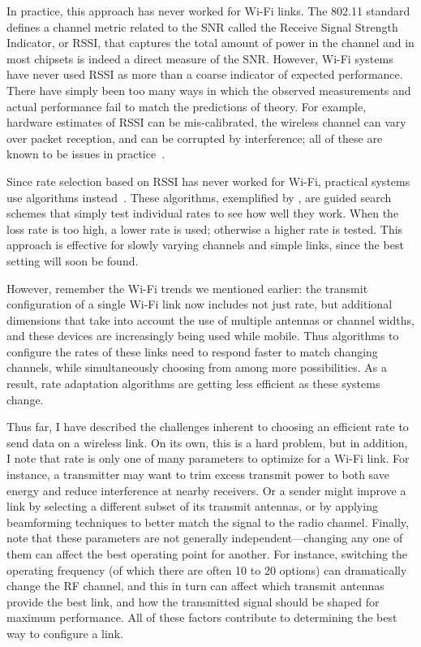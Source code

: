 In practice, this approach has never worked for Wi-Fi links. The 802.11 standard defines a channel metric related to the SNR called the Receive Signal Strength Indicator, or RSSI, that captures the total amount of power in the channel and in most chipsets is indeed a direct measure of the SNR. However, Wi-Fi systems have never used RSSI as more than a coarse indicator of expected performance. There have simply been too many ways in which the observed measurements and actual performance fail to match the predictions of theory. For example, hardware estimates of RSSI can be mis-calibrated, the wireless channel can vary over packet reception, and can be corrupted by interference; all of these are known to be issues in practice~\cite{Camp_rateadapt,Judd_CHARM,Reis_sigcomm06}.

Since rate selection based on RSSI has never worked for Wi-Fi, practical systems use  algorithms instead~\cite{Bicket_SampleRate,Minstrel,Wong_RRAA}. These algorithms, exemplified by , are guided search schemes that simply test individual rates to see how well they work. When the loss rate is too high, a lower rate is used; otherwise a higher rate is tested. This approach is effective for slowly varying channels and simple links, since the best setting will soon be found.

However, remember the Wi-Fi trends we mentioned earlier: the transmit configuration of a single Wi-Fi link now includes not just rate, but additional dimensions that take into account the use of multiple antennas or channel widths, and these devices are increasingly being used while mobile. Thus algorithms to configure the rates of these links need to respond faster to match changing channels, while simultaneously choosing from among more possibilities. As a result, rate adaptation algorithms are getting less efficient as these systems change.

Thus far, I have described the challenges inherent to choosing an efficient rate to send data on a wireless link. On its own, this is a hard problem, but in addition, I note that rate is only one of many parameters to optimize for a Wi-Fi link. For instance, a transmitter may want to trim excess transmit power to both save energy and reduce interference at nearby receivers. Or a sender might improve a link by selecting a different subset of its transmit antennas, or by applying beamforming techniques to better match the signal to the radio channel. Finally, note that these parameters are not generally independent---changing any one of them can affect the best operating point for another. For instance, switching the operating frequency (of which there are often 10 to 20 options) can dramatically change the RF channel, and this in turn can affect which transmit antennas provide the best link, and how the transmitted signal should be shaped for maximum performance. All of these factors contribute to determining the best way to configure a link.

